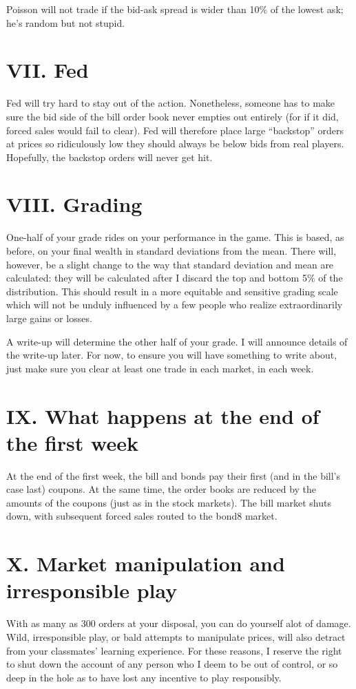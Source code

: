 Poisson will not trade if the bid-ask spread is wider than 10\% of the
lowest ask; he's random but not stupid.

\section{VII. Fed}%
Fed will try hard to stay out of the action.  Nonetheless, someone has
to make sure the bid side of the bill order book never empties out
entirely (for if it did, forced sales would fail to clear).  Fed will
therefore place large ``backstop'' orders at prices so ridiculously low
they should always be below bids from real players.  Hopefully, the
backstop orders will never get hit.

\section{VIII. Grading}%
One-half of your grade rides on your performance in the game.  This
is based, as before, on your final wealth in standard deviations from
the mean.  There will, however, be a slight change to the way that
standard deviation and mean are calculated: they will be calculated
after I discard the top and bottom 5\% of the distribution. This
should result in a more equitable and sensitive grading scale which
will not be unduly influenced by a few people who realize
extraordinarily large gains or losses.

A write-up will determine the other half of your grade.  I will
announce details of the write-up later.  For now, to ensure you will
have something to write about, just make sure you clear at least one
trade in each market, in each week.

\section{IX. What happens at the end of the first week}%
At the end of the first week, the bill and bonds pay their first (and
in the bill's case last) coupons.  At the same time, the order books
are reduced by the amounts of the coupons (just as in the stock
markets).  The bill market shuts down, with subsequent forced sales
routed to the bond8 market.  

\section{X. Market manipulation and irresponsible play}%
With as many as 300 orders at your disposal, you can do yourself alot
of damage.  Wild, irresponsible play, or bald attempts to manipulate
prices, will also detract from your classmates' learning experience.
For these reasons, I reserve the right to shut down the account of
any person who I deem to be out of control, or so deep in the hole as
to have lost any incentive to play responsibly.

